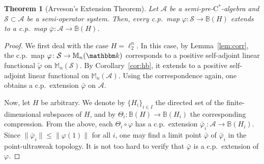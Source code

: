 \documentclass[12pt]{amsart}
\newtheorem{thm}{Theorem}
\theoremstyle{definition}
\begin{document}
\begin{thm}[Arveson's Extension Theorem]\label{thm:arveson}
Let ${{\mathcal A}}$ be a {semi-pre-$\mathrm{C}^*$-alge\-bra\xspace} and
${{\mathcal S}}\subset{{\mathcal A}}$ be a semi-operator system.
Then, every c.p.\ map ${\varphi}\colon{{\mathcal S}}\to{{\mathbb B}}({H})$ extends to
a c.p.\ map $\bar{\varphi}\colon{{\mathcal A}}\to{{\mathbb B}}({H})$.
\end{thm}
\begin{proof}
We first deal with the case ${H}=\ell_2^n$. In this case, by Lemma~\ref{lem:corr},
the c.p.\ map ${\varphi}\colon{{\mathcal S}}\to{{\mathbb M}}_n({{\mathbbm k}})$ corresponds to
a positive self-adjoint linear functional $\tilde{\varphi}$ on ${{\mathbb M}}_n({{\mathcal S}})$.
By Corollary~\ref{cor:hb}, it extends to a positive self-adjoint linear functional
on ${{\mathbb M}}_n({{\mathcal A}})$. Using the correspondence again, one obtains a c.p.\ extension
$\bar{\varphi}$ on ${{\mathcal A}}$.

Now, let ${H}$ be arbitrary. We denote by $\{{H}_i\}_{i\in I}$ the
directed set of the finite-dimensional subspaces of ${H}$, and by $\Theta_i\colon{{\mathbb B}}({H})\to{{\mathbb B}}({H}_i)$
the corresponding compression.
 From the above, each $\Theta_i\circ{\varphi}$ has a c.p.\ extension $\bar{\varphi}_i\colon{{\mathcal A}}\to{{\mathbb B}}({H}_i)$.
Since $\|\bar{\varphi}_i\|\le\|{\varphi}(1)\|$ for all $i$, one may find a limit point $\bar{\varphi}$ of $\bar{\varphi}_i$
in the point-ultraweak topology.
It is not too hard to verify that $\bar{\varphi}$ is a c.p.\ extension of ${\varphi}$.
\end{proof}
\end{document}
